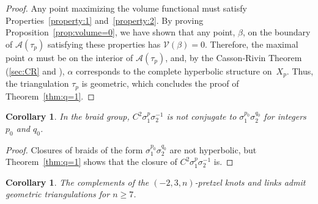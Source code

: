 \documentclass[reqno]{amsart}
\theoremstyle{plain}
\newtheorem{cor}[thm]{Corollary}
\theoremstyle{definition}
\begin{document}
\begin{proof}
Any point maximizing the volume functional must satisfy Properties~\ref{property:1} and~\ref{property:2}.  By proving Proposition~\ref{prop:volume=0}, we have shown that any point, $\beta$, on the boundary of $\mathcal{A}(\tau_{p})$ satisfying these properties has $\mathcal{V}(\beta)=0$.  Therefore, the maximal point $\alpha$ must be on the interior of $\mathcal A(\tau_{p})$, and, by the Casson-Rivin Theorem (\ref{sec:CR} and \cite[Theorem 1.2]{AngledtoHyperbolic}), $\alpha$ corresponds to the complete hyperbolic structure on~$X_{p}$.  Thus, the triangulation $\tau_{p}$ is geometric, which concludes the proof of Theorem~\ref{thm:q=1}.
\end{proof}

\begin{cor}\label{cor:notconjugate}
In the braid group, $C^2\sigma_1^p\sigma_2^{-1}$ is not conjugate to $\sigma_1^{p_0}\sigma_2^{q_0}$ for integers $p_0$ and $q_0$.
\end{cor}

\begin{proof}
Closures of braids of the form $\sigma_1^{p_0}\sigma_2^{q_0}$ are not hyperbolic, but Theorem~\ref{thm:q=1} shows that the closure of $C^2\sigma_1^p\sigma_2^{-1}$ is.
\end{proof}

\begin{cor}\label{cor:pretzelstoo}
The complements of the $(-2,3,n)$-pretzel knots and links admit geometric triangulations for $n\ge7$.
\end{cor}
\end{document}
